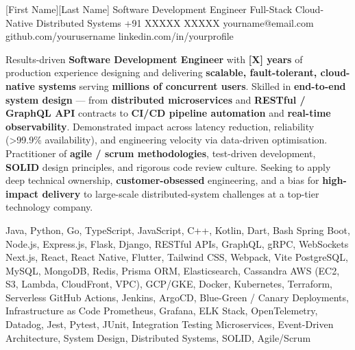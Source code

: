 \documentclass{bhaumic}
\begin{document}
\makeheader
  {[First Name]}{[Last Name]}
  {Software Development Engineer \textbar{} Full-Stack \textbar{} Cloud-Native \textbar{} Distributed Systems}
  {+91 XXXXX XXXXX}
  {yourname@email.com}
  {github.com/yourusername}
  {linkedin.com/in/yourprofile}


\begin{resumesummary}
Results-driven \textbf{Software Development Engineer} with \textbf{[X] years} of production experience designing and
delivering \textbf{scalable, fault-tolerant, cloud-native systems} serving \textbf{millions of concurrent users}.
Skilled in \textbf{end-to-end system design} — from \textbf{distributed microservices} and \textbf{RESTful / GraphQL API}
contracts to \textbf{CI/CD pipeline automation} and \textbf{real-time observability}.
Demonstrated impact across latency reduction, reliability (\textgreater 99.9\% availability), and engineering
velocity via data-driven optimisation.
Practitioner of \textbf{agile / scrum methodologies}, test-driven development, \textbf{SOLID} design principles,
and rigorous code review culture.
Seeking to apply deep technical ownership, \textbf{customer-obsessed} engineering, and a bias for
\textbf{high-impact delivery} to large-scale distributed-system challenges at a top-tier technology company.
\end{resumesummary}


\begin{skilltable}
    {Java, Python, Go, TypeScript, JavaScript, C++, Kotlin, Dart, Bash}
    {Spring Boot, Node.js, Express.js, Flask, Django, RESTful APIs, GraphQL, gRPC, WebSockets}
    {Next.js, React, React Native, Flutter, Tailwind CSS, Webpack, Vite}
    {PostgreSQL, MySQL, MongoDB, Redis, Prisma ORM, Elasticsearch, Cassandra}
    {AWS (EC2, S3, Lambda, CloudFront, VPC), GCP/GKE, Docker, Kubernetes, Terraform, Serverless}
    {GitHub Actions, Jenkins, ArgoCD, Blue-Green / Canary Deployments, Infrastructure as Code}
    {Prometheus, Grafana, ELK Stack, OpenTelemetry, Datadog, Jest, Pytest, JUnit, Integration Testing}
    {Microservices, Event-Driven Architecture, System Design, Distributed Systems, SOLID, Agile/Scrum}
\end{skilltable}
\end{document}

